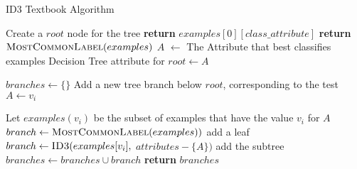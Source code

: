\begin{algorithm}[H]
\caption{ID3 Textbook Algorithm }\label{a:id3-simple}
\begin{algorithmic}[1]
    \State Create a $root$ node for the tree
        \State \textbf{return} $examples[0][class\_attribute]$
        \State \textbf{return} $\textsc{MostCommonLabel}(examples)$
    \EndIf
    \State $A$ $\gets$ The Attribute that best classifies examples
    \State Decision Tree attribute for $root \gets A$

    \State $branches \gets \{\}$
        \State Add a new tree branch below $root$, corresponding to the test $A \gets v_i$
        
        \State Let $examples(v_i)$ be the subset of examples that have the value $v_i$ for $A$
            \State $branch \gets \textsc{MostCommonLabel}(examples))$ add a leaf
        \Else
            \State $branch \gets \textsc{ID3}(examples[v_i],$ $attributes - \{A\})$ add the subtree
        \EndIf
        \State $branches \gets branches \cup branch$
    \EndFor
    \State \textbf{return} $branches$
\EndProcedure
\end{algorithmic}
\end{algorithm}

